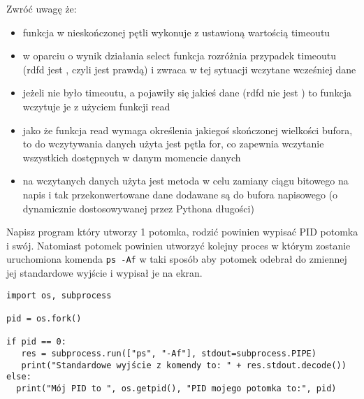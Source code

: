 \noindent Zwróć uwagę że:
\begin{itemize}
\item funkcja w nieskończonej pętli wykonuje  z ustawioną wartością timeoutu
\item w oparciu o wynik działania select funkcja rozróżnia przypadek timeoutu (rdfd jest , czyli  jest prawdą) i zwraca w tej sytuacji wczytane wcześniej dane
\item jeżeli nie było timeoutu, a pojawiły się jakieś dane (rdfd nie jest ) to funkcja wczytuje je z użyciem funkcji read
\item jako że funkcja read wymaga określenia jakiegoś skończonej wielkości bufora, to do wczytywania danych użyta jest pętla for, co zapewnia wczytanie wszystkich dostępnych w danym momencie danych
\item na wczytanych danych użyta jest metoda  w celu zamiany ciągu bitowego na napis i tak przekonwertowane dane dodawane są do bufora napisowego (o dynamicznie dostosowywanej przez Pythona długości)
\end{itemize}
\fi


\dbEntryCheckResults
Napisz program który utworzy 1 potomka, rodzić powinien wypisać PID potomka i swój. Natomiast potomek powinien utworzyć kolejny proces w którym zostanie uruchomiona komenda \Verb#ps -Af# w taki sposób aby potomek odebrał do zmiennej jej standardowe wyjście i wypisał je na ekran.
\fi

\dbEntryCheckResults
\begin{verbatim}
import os, subprocess

pid = os.fork()

if pid == 0:
   res = subprocess.run(["ps", "-Af"], stdout=subprocess.PIPE)
   print("Standardowe wyjście z komendy to: " + res.stdout.decode())
else:
  print("Mój PID to ", os.getpid(), "PID mojego potomka to:", pid)
\end{verbatim}

